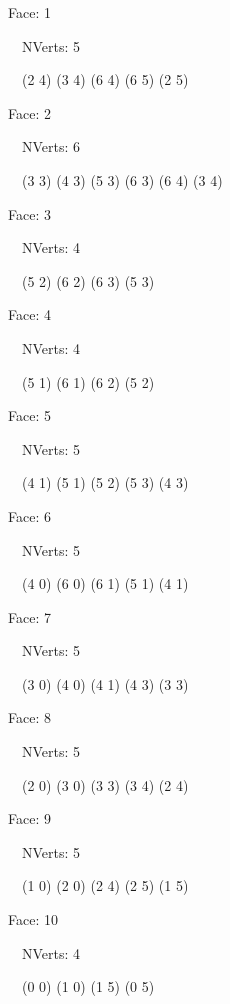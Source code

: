 \documentclass{article}
\begin{document}
{\footnotesize 

Face: 1

\   \    NVerts: 5

 \   \   (2 4) (3 4) (6 4) (6 5) (2 5)}

{\footnotesize 

Face: 2

\   \    NVerts: 6

 \   \   (3 3) (4 3) (5 3) (6 3) (6 4) (3 4)}

{\footnotesize 

Face: 3

\   \    NVerts: 4

 \   \   (5 2) (6 2) (6 3) (5 3)}

{\footnotesize 

Face: 4

\   \    NVerts: 4

 \   \   (5 1) (6 1) (6 2) (5 2)}

{\footnotesize 

Face: 5

\   \    NVerts: 5

 \   \   (4 1) (5 1) (5 2) (5 3) (4 3)}

{\footnotesize 

Face: 6

\   \    NVerts: 5

 \   \   (4 0) (6 0) (6 1) (5 1) (4 1)}

{\footnotesize 

Face: 7

\   \    NVerts: 5

 \   \   (3 0) (4 0) (4 1) (4 3) (3 3)}

{\footnotesize 

Face: 8

\   \    NVerts: 5

 \   \   (2 0) (3 0) (3 3) (3 4) (2 4)}

{\footnotesize 

Face: 9

\   \    NVerts: 5

 \   \   (1 0) (2 0) (2 4) (2 5) (1 5)}

{\footnotesize 

Face: 10

\   \    NVerts: 4

 \   \   (0 0) (1 0) (1 5) (0 5)}


 \newpage
\end{document}
